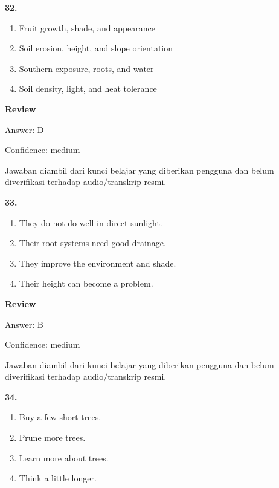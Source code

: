 \documentclass[12pt]{article}
\begin{document}
\noindent\textbf{32.}
\begin{enumerate}[label=(\Alph*),leftmargin=*,itemsep=0.2em]
\item Fruit growth, shade, and appearance
\item Soil erosion, height, and slope orientation
\item Southern exposure, roots, and water
\item Soil density, light, and heat tolerance
\end{enumerate}
\par
\begingroup
\setlength{\parskip}{0pt}
\setlength{\parindent}{0pt}
\textbf{Review}\par
Answer: D\par
Confidence: medium\par
Jawaban diambil dari kunci belajar yang diberikan pengguna dan belum diverifikasi terhadap audio/transkrip resmi.\par
\endgroup
\par
\vspace{0.25\baselineskip}
\noindent\textbf{33.}
\begin{enumerate}[label=(\Alph*),leftmargin=*,itemsep=0.2em]
\item They do not do well in direct sunlight.
\item Their root systems need good drainage.
\item They improve the environment and shade.
\item Their height can become a problem.
\end{enumerate}
\par
\begingroup
\setlength{\parskip}{0pt}
\setlength{\parindent}{0pt}
\textbf{Review}\par
Answer: B\par
Confidence: medium\par
Jawaban diambil dari kunci belajar yang diberikan pengguna dan belum diverifikasi terhadap audio/transkrip resmi.\par
\endgroup
\par
\vspace{0.25\baselineskip}
\noindent\textbf{34.}
\begin{enumerate}[label=(\Alph*),leftmargin=*,itemsep=0.2em]
\item Buy a few short trees.
\item Prune more trees.
\item Learn more about trees.
\item Think a little longer.
\end{enumerate}
\end{document}
